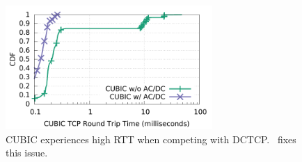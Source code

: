 \begin{figure}[!t]
        \centering
  \includegraphics[width=0.7\textwidth]{acdctcp/figures/micro2flows/coexitence/sockperf_and_droprate/coexistence_sockperf.pdf}
        \caption{CUBIC experiences high RTT when competing with DCTCP.~\acdc{} fixes this issue.}
        \label{coexistence_sockperf_droprate}
\end{figure}

